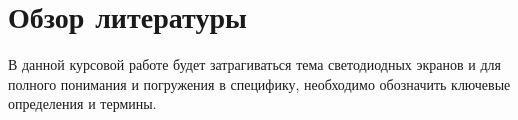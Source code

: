 \section{Обзор литературы}
\label{sec:literature}
В данной курсовой работе будет затрагиваться тема светодиодных экранов и для полного понимания и погружения в специфику, необходимо обозначить ключевые определения и термины.




